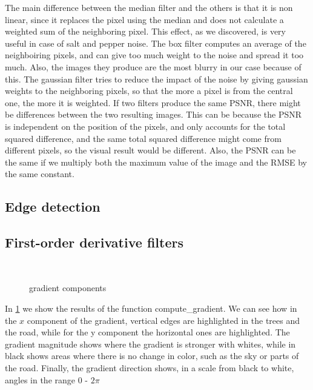 \documentclass{article}
\begin{document}
The main difference between the median filter and the others is that it is non linear, since it replaces the pixel using the median and does not calculate a weighted sum of the neighboring pixel. This effect, as we discovered, is very useful in case of salt and pepper noise. The box filter computes an average of the neighboiring pixels, and can give too much weight to the noise and spread it  too much. Also, the images they produce are the most blurry in our case because of this. The gaussian filter tries to reduce the impact of the noise by giving gaussian weights to the neighboring pixels, so that the more a pixel is from the central one, the more it is weighted. If two filters produce the same PSNR, there might be differences between the two resulting images. This can be because the PSNR is independent on the position of the pixels, and only accounts for the total squared difference, and the same total squared difference might come from different pixels, so the visual result would be different. Also, the PSNR can be the same if we multiply both the maximum value of the image and the RMSE by the same constant. 


\subsection{Edge detection}
\subsection{First-order derivative filters}

\begin{figure}[h]
        \centering
    \caption{ gradient components }
    \\
    \label{fig:gradients_components}
\end{figure}

In \cref{fig:gradients_components} we show the results of the function compute\_gradient. We can see how in the $x$ component of the gradient, vertical edges are highlighted in the trees and the road, while for the y component the horizontal ones are highlighted. The gradient magnitude shows where the gradient is stronger with whites, while in black shows areas where there is no change in color, such as the sky or parts of the road. Finally, the gradient direction shows, in a scale from black to white, angles in the range 0 - $2\pi$
\end{document}
